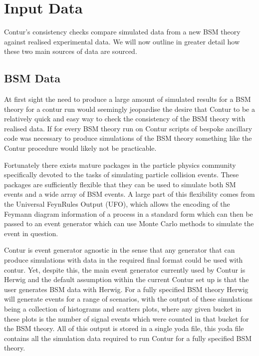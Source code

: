 \section{Input Data}

Contur's consistency checks compare simulated data from a new BSM theory against realised experimental data. We will now outline in greater detail how these two main sources of data are sourced.

\subsection{BSM Data}

At first sight the need to produce a large amount of simulated results for a BSM theory for a contur run would seemingly jeopardise the desire that Contur to be a relatively quick and easy way to check the consistency of the BSM theory with realised data. If for every BSM theory run on Contur scripts of bespoke ancillary code was necessary to produce simulations of the BSM theory something like the Contur procedure would likely not be practicable. 

Fortunately there exists mature packages in the particle physics community specifically devoted to the tasks of simulating particle collision events. These packages are sufficiently flexible that they can be used to simulate both SM events and a wide array of BSM events. A large part of this flexibility comes from the Universal FeynRules Output (UFO)\cite{ufo}, which allows the encoding of the Feymann diagram information of a process in a standard form which can then be passed to an event generator which can use Monte Carlo methods to simulate the event in question.

Contur is event generator agnostic in the sense that any generator that can produce simulations with data in the required final format could be used with contur. Yet, despite this, the main event generator currently used by Contur is Herwig\cite{herwig} and the default assumption within the current Contur set up is that the user generates BSM data with Herwig. For a fully specified BSM theory Herwig will generate events for a range of scenarios, with the output of these simulations being a collection of histograms and scatters plots, where any given bucket in these plots is the number of signal events which were counted in that bucket for the BSM theory. All of this output is stored in a single yoda file\cite{yoda}, this yoda file contains all the simulation data required to run Contur for a fully specified BSM theory.

